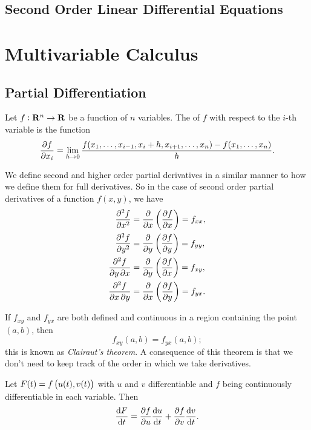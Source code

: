 \subsection{Second Order Linear Differential Equations}


\section{Multivariable Calculus}
\subsection{Partial Differentiation}
\begin{definition}
Let $f:\mathbf R^n\to\mathbf R$ be a function of $n$ variables. The  of $f$ with respect to the $i$-th variable is the function
\[\pdv{f}{x_i}=\lim_{h\to0}\frac{f(x_1,\dots,x_{i-1},x_i+h,x_{i+1},\dots,x_n)-f(x_1,\dots,x_n)}{h}.\]
\end{definition}

\begin{notation}
We define second and higher order partial derivatives in a similar manner to how we define them for full derivatives. So in the case of second order partial derivatives of a function $f(x,y)$, we have
\begin{align*}
\pdv[2]{f}{x}&=\pdv{}{x}\left(\pdv{f}{x}\right)=f_{xx},\\
\pdv[2]{f}{y}&=\pdv{}{y}\left(\pdv{f}{y}\right)=f_{yy},\\
\pdv{f}{y,x}&=\pdv{}{y}\left(\pdv{f}{x}\right)=f_{xy},\\
\pdv{f}{x,y}&=\pdv{}{x}\left(\pdv{f}{y}\right)=f_{yx}.
\end{align*}
\end{notation}

If $f_{xy}$ and $f_{yx}$ are both defined and continuous in a region containing the point $(a,b)$, then 
\[f_{xy}(a,b)=f_{yx}(a,b);\]
this is known as \emph{Clairaut's theorem}. A consequence of this theorem is that we don't need to keep track of the order in which we take derivatives.

\begin{theorem}
Let $F(t)=f\left(u(t),v(t)\right)$ with $u$ and $v$ differentiable and $f$ being continuously differentiable in each variable. Then
\begin{equation}
\dv{F}{t}=\pdv{f}{u}\dv{u}{t}+\pdv{f}{v}\dv{v}{t}.
\end{equation}
\end{theorem}




